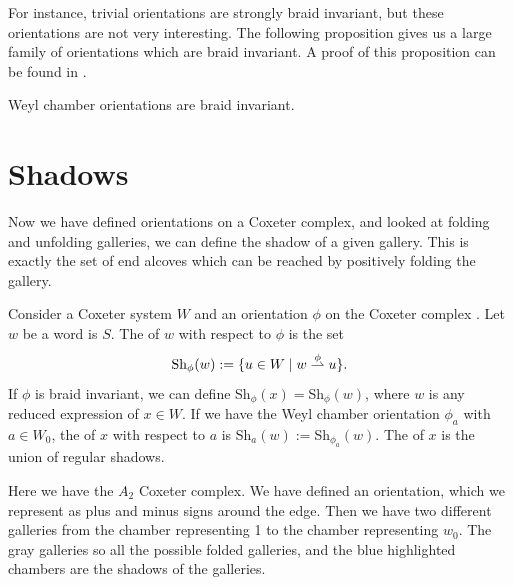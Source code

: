 \documentclass[11pt]{article}
\begin{document}
For instance, trivial orientations are strongly braid invariant, but these orientations are not very interesting. The following proposition gives us a large family of orientations which are braid invariant. A proof of this proposition can be found in \cite[pp.135-138]{SHA}.

\begin{proposition}
    Weyl chamber orientations are braid invariant.
\end{proposition}


\section{Shadows}\label{8}
Now we have defined orientations on a Coxeter complex, and looked at folding and unfolding galleries, we can define the shadow of a given gallery. This is exactly the set of end alcoves which can be reached by positively folding the gallery. 


\begin{definition}
    Consider a Coxeter system $W$ and an orientation $\phi$ on the Coxeter complex \sg\W. Let $w$ be a word is $S$. The  of $w$ with respect to $\phi$ is the set 
    \[\textnormal{Sh}_\phi(w):=\{u\in W\mid w\stackrel{\phi}{\rightharpoonup} u\}.\]
    If $\phi$ is braid invariant, we can define Sh$_\phi(x)=$Sh$_\phi(w)$, where $w$ is any reduced expression of $x\in W$. If we have the Weyl chamber orientation $\phi_a$ with $a\in W_0$, the  of $x$ with respect to $a$ is Sh$_a(w):=$Sh$_{\phi_a}(w)$. The  of $x$ is the union of regular shadows. 
\end{definition}

\begin{example}
    Here we have the $A_2$ Coxeter complex. We have defined an orientation, which we represent as plus and minus signs around the edge. Then we have two different galleries from the chamber representing 1 to the chamber representing $w_0$. The gray galleries so all the possible folded galleries, and the blue highlighted chambers are the shadows of the galleries.
\end{example}
\end{document}
